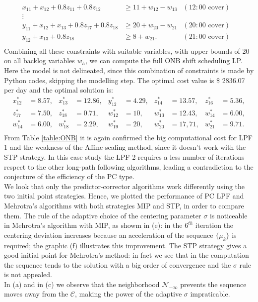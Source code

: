\documentclass[a4paper,10 pt,titlepage,twoside]{report}
\theoremstyle{plain}
\theoremstyle{definition}
\theoremstyle{remark}
\begin{document}
{{\begin{align*}
x_{11}+x_{12}+0.8z_{11}+0.8z_{12}&\geq11 +w_{12}-w_{13}&(12:00 \text{ cover})&\\
\vdots&&&\\
y_{11}+x_{12}+x_{13}+0.8z_{17}+0.8z_{18}&\geq 20 +w_{20}-w_{21}&(20:00 \text{ cover})&\\
y_{12}+x_{13}+0.8z_{18}&\geq 8 +w_{21}.&(21:00 \text{ cover})&\\
\end{align*}
Combining all these constraints with suitable variables, with upper bounds of 20 on all backlog variables $w_{h}$, we can compute the full ONB shift scheduling LP. Here the model is not delineated, since this combination of constraints is made by Python codes, skipping the modelling step. The optimal cost value is \$ 2836.07 per day and the optimal solution is:
\begin{align*}
x_{12}^{*} &=  8.57, & x_{13}^{*}&=  12.86, & y_{12}^{*} &= 4.29, & z_{14}^{*} &= 13.57, &z_{16}^{*} &= 5.36,\\
z_{17}^{*} &= 7.50, & z_{18}^{*}&= 0.71,  & w_{12}^{*} &= 10, & w_{13}^{*} &= 12.43, &w_{14}^{*} &=  6.00,\\
w_{14}^{*} &=  6.00, & w_{18}^{*}&=  2.29, & w_{19}^{*} &= 20, & w_{20}^{*} &= 17,71, &w_{21}^{*} &= 9.71.\\
\end{align*}
From Table \ref{table:ONB} it is again confirmed the big computational cost for LPF 1 and the weakness of the Affine-scaling method, since it doesn't work with the STP strategy. In this case study the LPF 2 requires a less number of iterations respect to the other long-path following algorithms, leading a contradiction to the conjecture of the efficiency of the PC type.\\ 
We look that only the predictor-corrector algorithms work differently using the two initial point strategies.
Hence, we plotted the performance of PC LPF and Mehrotra's algorithms with both strategies MIP and STP, in order to compare them. The rule of the adaptive choice of the centering parameter $\sigma$ is noticeable in Mehrotra's algorithm with MIP, as showm in (e): in the $6^{th}$ iteration the centering deviation increases because an acceleration of the sequence $\{\mu_{k}\}$ is required; the graphic (f) illustrates this improvement. The STP strategy gives a good initial point for Mehrotra's method: in fact we see that in the computation the sequence tends to the solution with a big order of convergence and the $\sigma$ rule is not appealed.\\
In (a) and in (c) we observe that the neighborhood $\mathcal{N}_{-\infty}$ prevents the sequence moves away from the $\mathcal{C}$, making the power of the adaptive $\sigma$ impraticable.\\  

}}
\end{document}
